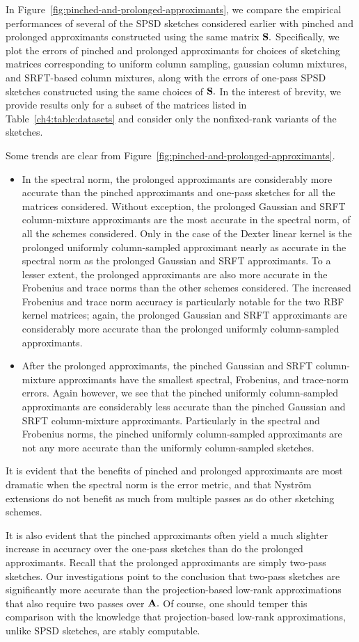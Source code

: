 In Figure~\ref{fig:pinched-and-prolonged-approximants}, we compare the empirical 
performances of several of the SPSD sketches considered earlier with  
pinched and prolonged approximants constructed using the same matrix $\mathbf{S}.$
Specifically, we plot the errors of
pinched and prolonged approximants for choices of sketching
matrices corresponding to uniform column sampling, gaussian column 
mixtures, and SRFT-based column mixtures, along with the errors of one-pass
SPSD sketches constructed using the same choices of $\mathbf{S}.$ In the
interest of brevity, we provide results only for a subset of the matrices 
listed in Table~\ref{ch4:table:datasets} and consider only the nonfixed-rank 
variants of the sketches.

Some trends are clear from Figure~\ref{fig:pinched-and-prolonged-approximants}.
\begin{itemize}
\item In the spectral norm, the prolonged approximants are considerably more accurate 
than the pinched approximants and one-pass sketches for all the matrices considered. Without 
exception, the prolonged Gaussian and SRFT column-mixture approximants are the most accurate
in the spectral norm, of all the schemes considered. Only in the case of the 
Dexter linear kernel is the prolonged uniformly column-sampled approximant nearly as
accurate in the spectral norm as the prolonged Gaussian and SRFT approximants. To
 a lesser extent, the prolonged approximants are also more accurate in the Frobenius
 and trace norms than the other schemes considered. The increased Frobenius and
 trace norm accuracy is particularly notable for the two RBF kernel matrices;
 again, the prolonged Gaussian and SRFT approximants are considerably more accurate
 than the prolonged uniformly column-sampled approximants.  
 \item After the 
 prolonged approximants, the pinched Gaussian and SRFT column-mixture approximants 
 have the smallest spectral, Frobenius, and trace-norm 
 errors. Again however, we see that the pinched uniformly column-sampled 
 approximants are considerably less accurate than the
 pinched Gaussian and SRFT column-mixture approximants. Particularly in the 
 spectral and Frobenius norms, the pinched uniformly column-sampled approximants
 are not any more accurate than the uniformly column-sampled sketches.
 \end{itemize}
It is evident that the benefits of pinched and
prolonged approximants are most dramatic when the spectral norm is the error metric,
and that Nystr\"om extensions do not benefit as much from multiple passes as do other
sketching schemes.

It is also evident that the pinched approximants
often yield a much slighter increase in accuracy over the one-pass sketches than do the
prolonged approximants. Recall that the prolonged approximants are simply
two-pass sketches. Our investigations point to the conclusion that two-pass sketches
are significantly more accurate than the projection-based low-rank approximations
that also require two passes over $\mathbf{A}.$ Of course, one should temper this
comparison with the knowledge that projection-based low-rank approximations, unlike SPSD sketches, are stably computable.